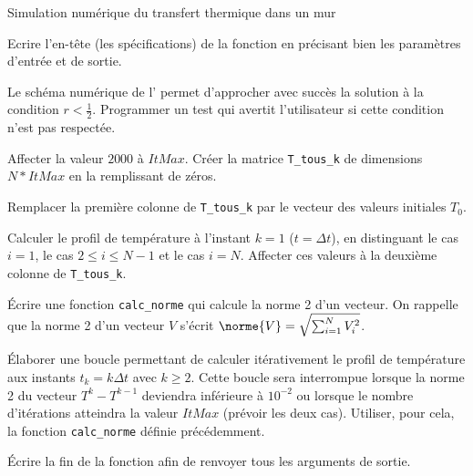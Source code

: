 \begin{exo}[PC][1][devoir]{Simulation numérique du transfert thermique dans un mur}
{\begin{quest}
\item  Ecrire l’en-tête (les spécifications) de la fonction en précisant bien les paramètres d’entrée et de sortie.
\item  Le schéma numérique de l' permet d’approcher avec succès la solution à la condition $r < \frac{1}{2}$.
Programmer un test qui avertit l’utilisateur si cette condition n’est pas respectée.
\item Affecter la valeur $2 000$ à $ItMax$. Créer la matrice \texttt{T\_tous\_k} de dimensions $N * ItMax$ en la remplissant de zéros.
\item Remplacer la première colonne de \texttt{T\_tous\_k} par le vecteur des valeurs initiales $T_0$.
\item Calculer le profil de température à l’instant $k = 1$ ($t = \Delta t$), en distinguant le cas $i = 1$, le cas $2 \leq i  \leq N - 1$ et le cas $i = N$. Affecter ces valeurs à la deuxième colonne de \texttt{T\_tous\_k}.
\item Écrire une fonction \texttt{calc\_norme} qui calcule la norme 2 d’un vecteur. On rappelle que la norme 2 d’un vecteur $V$  s’écrit $\norme{V} = \sqrt{\sum_{i=1}^N V_i^2}$.
\item Élaborer une boucle permettant de calculer itérativement le profil de température aux instants $t_k = k \Delta t$ avec $k \geq 2$. Cette boucle sera interrompue lorsque la norme 2 du vecteur $T^k - T^{k-1}$ deviendra inférieure à $10^{-2}$ ou lorsque le nombre d’itérations atteindra la valeur $ItMax$ (prévoir les deux cas).
Utiliser, pour cela, la fonction \texttt{calc\_norme} définie précédemment.
\item Écrire la fin de la fonction afin de renvoyer tous les arguments de sortie.
\end{quest}
}

\end{exo}

